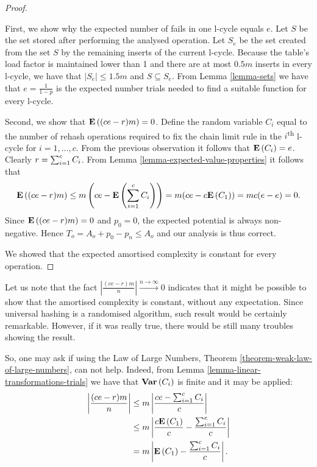 \begin{proof}
\begin{itemize}
First, we show why the expected number of fails in one l-cycle equals $e$. Let $S$ be the set stored after performing the analysed operation. Let $S_e$ be the set created from the set $S$ by the remaining inserts of the current l-cycle. Because the table's load factor is maintained lower than 1 and there are at most $0.5 m$ inserts in every l-cycle, we have that $|S_e| \leq 1.5m$ and $S \subseteq S_e$. From Lemma \ref{lemma-sets} we have that $e = \frac{1}{1 - p}$ is the expected number trials needed to find a suitable function for every l-cycle.

Second, we show that $\mathbf{E}\left((ce - r)m\right) = 0$. Define the random variable $C_i$ equal to the number of rehash operations required to fix the chain limit rule in the $i$\textsuperscript{th} l-cycle for $i = 1, \dots, c$. From the previous observation it follows that $\mathbf{E}\left(C_i\right) = e$. Clearly $r = \sum\displaylimits_{i = 1}^{c} C_i$. From Lemma \ref{lemma-expected-value-properties} it follows that
\[
	\mathbf{E}\left({(ce - r)m}\right) \leq {m}\left(ce - \mathbf{E}\left(\displaystyle\sum_{i = 1}^{c} C_i\right)\right) = m(ce - c\mathbf{E}\left(C_1\right)) = mc(e - e) = 0 \text{.}
\]
Since $\mathbf{E}\left((ce - r)m\right) = 0$ and $p_0 = 0$, the expected potential is always non-negative. Hence $T_o = A_o + p_0 - p_n \leq A_o$ and our analysis is thus correct.
\end{itemize}

We showed that the expected amortised complexity is constant for every operation.
\end{proof}

Let us note that the fact $\left|\frac{(ce - r)m}{n}\right| \xrightarrow{n \rightarrow \infty} 0$ indicates that it might be possible to show that the amortised complexity is constant, without any expectation. Since universal hashing is a randomised algorithm, such result would be certainly remarkable. However, if it was really true, there would be still many troubles showing the result.

So, one may ask if using the Law of Large Numbers, Theorem \ref{theorem-weak-law-of-large-numbers}, can not help. Indeed, from Lemma \ref{lemma-linear-transformations-trials} we have that $\mathbf{Var}\left(C_i\right)$ is finite and it may be applied:
\[
\begin{split}
\left|\frac{(ce - r)m}{n}\right|
	& \leq m \left|\frac{ce - \sum\displaylimits_{i = 1}^{c} C_i}{c}\right| \\
	& \leq m \left|\frac{c\mathbf{E}\left(C_1\right)}{c} - \frac{\sum\displaylimits_{i = 1}^{c} C_i}{c}\right| \\
	& = m \left|\mathbf{E}\left(C_1\right) - \frac{\sum\displaylimits_{i = 1}^{c} C_i}{c}\right| \text{.}
\end{split}
\]

